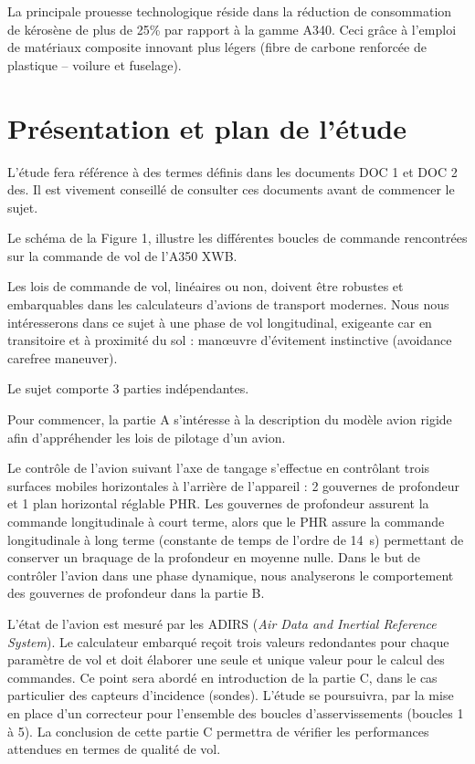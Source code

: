 \begin{multicols}{2}
La principale prouesse technologique réside dans la réduction de consommation de kérosène de plus de 25\% par rapport à la gamme A340. Ceci grâce à l’emploi de matériaux composite innovant plus légers (fibre de carbone renforcée de plastique -- voilure et fuselage).


\section*{Présentation et plan de l'étude}
L’étude fera référence à des termes définis dans les documents DOC 1 et DOC 2 des.	Il est vivement conseillé de consulter ces documents avant de commencer le sujet.


Le schéma de la Figure 1, illustre les différentes boucles de commande rencontrées sur la commande de vol de l’A350 XWB.

Les lois de commande de vol, linéaires ou non, doivent être robustes et embarquables dans les calculateurs d’avions de transport modernes. Nous nous intéresserons dans ce sujet à une phase de vol longitudinal, exigeante car en transitoire et à proximité du sol : manœuvre d’évitement instinctive (avoidance carefree maneuver).

Le sujet comporte 3 parties indépendantes.

Pour commencer, la partie A s’intéresse à la description du modèle avion rigide afin d’appréhender les lois de pilotage d’un avion.

Le contrôle de l’avion suivant l’axe de tangage s’effectue en contrôlant trois surfaces mobiles horizontales à l’arrière de l’appareil : 2 gouvernes de profondeur et 1 plan horizontal réglable PHR.
Les gouvernes de profondeur assurent la commande longitudinale à court terme, alors que le PHR assure la commande longitudinale à long terme (constante de temps de l’ordre de \SI{14}{s}) permettant de conserver un braquage de la profondeur en moyenne nulle.
Dans le but de contrôler l’avion dans une phase dynamique, nous analyserons le comportement des gouvernes de profondeur dans la partie B.

L’état de l’avion est mesuré par les ADIRS (\textit{Air Data and Inertial Reference System}). Le calculateur embarqué reçoit trois valeurs redondantes pour chaque paramètre de vol et doit élaborer une seule et unique valeur pour le calcul des commandes. Ce point sera abordé en introduction de la partie C, dans le cas particulier des capteurs d’incidence (sondes). L’étude se poursuivra, par la mise en place d’un correcteur pour l’ensemble des boucles d’asservissements (boucles 1 à 5). La conclusion de cette partie C permettra de vérifier les performances attendues en termes de qualité de vol.


\end{multicols}
